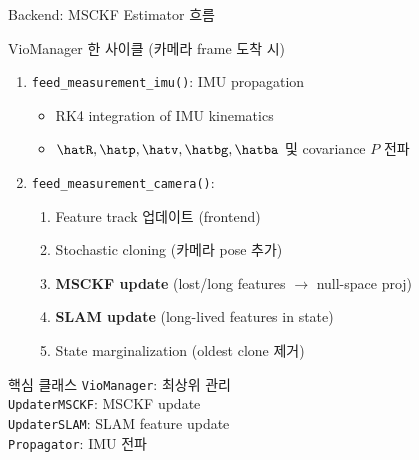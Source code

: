 \begin{frame}[shrink=10]{Backend: MSCKF Estimator 흐름}
  \begin{block}{VioManager 한 사이클 (카메라 frame 도착 시)}
    \begin{enumerate}
      \item \texttt{feed\_measurement\_imu()}: IMU propagation
        \begin{itemize}
          \item RK4 integration of IMU kinematics
          \item $\hatR, \hatp, \hatv, \hatbg, \hatba$ 및 covariance $P$ 전파
        \end{itemize}
      \item \texttt{feed\_measurement\_camera()}:
        \begin{enumerate}
          \item Feature track 업데이트 (frontend)
          \item Stochastic cloning (카메라 pose 추가)
          \item \textbf{MSCKF update} (lost/long features $\to$ null-space proj)
          \item \textbf{SLAM update} (long-lived features in state)
          \item State marginalization (oldest clone 제거)
        \end{enumerate}
    \end{enumerate}
  \end{block}
  \begin{exampleblock}{핵심 클래스}
    \texttt{VioManager}: 최상위 관리\\
    \texttt{UpdaterMSCKF}: MSCKF update\\
    \texttt{UpdaterSLAM}: SLAM feature update\\
    \texttt{Propagator}: IMU 전파
  \end{exampleblock}
\end{frame}


